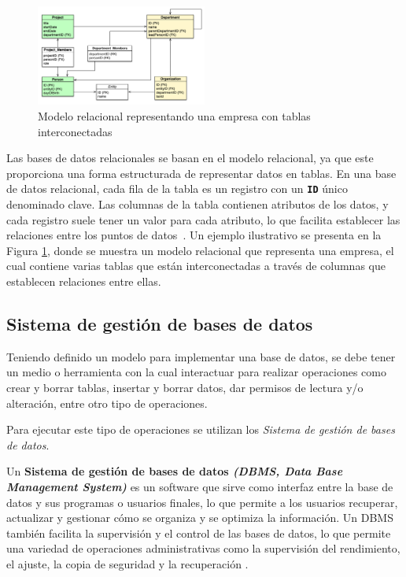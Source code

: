 
\begin{figure}[!h]
\centering
\includegraphics[width=0.5\textwidth]{images/ejemplo-modelo-relacional.png}
\caption{Modelo relacional representando una empresa con tablas interconectadas}\label{fig:ejemploRelacional}
\end{figure}

Las bases de datos relacionales se basan en el modelo relacional, ya que este proporciona una forma estructurada de representar datos en tablas. En una base de datos relacional, cada fila de la tabla es un registro con un \textbf{\texttt{ID}} único denominado clave. Las columnas de la tabla contienen atributos de los datos, y cada registro suele tener un valor para cada atributo, lo que facilita establecer las relaciones entre los puntos de datos~\cite{sql_thesis1}. 
Un ejemplo ilustrativo se presenta en la Figura \ref{fig:ejemploRelacional}, donde se muestra un modelo relacional que representa una empresa, el cual contiene varias tablas que están interconectadas a través de columnas que establecen relaciones entre ellas.


\subsection{Sistema de gestión de bases de datos}

Teniendo definido un modelo para implementar una base de datos, se debe tener un medio o herramienta con la cual interactuar para realizar operaciones como crear y borrar tablas, insertar y borrar datos, dar permisos de lectura y/o alteración, entre otro tipo de operaciones.

Para ejecutar este tipo de operaciones se utilizan los 
\textit{Sistema de gestión de bases de datos}. 

Un \textbf{Sistema de gestión de bases de datos \textit{(DBMS, Data Base Management System)}} es un software que sirve como interfaz entre la base de datos y sus programas o usuarios finales, lo que permite a los usuarios recuperar, actualizar y gestionar cómo se organiza y se optimiza la información. Un DBMS también facilita la supervisión y el control de las bases de datos, lo que permite una variedad de operaciones administrativas como la supervisión del rendimiento, el ajuste, la copia de seguridad y la recuperación \cite{sql_thesis2}.

